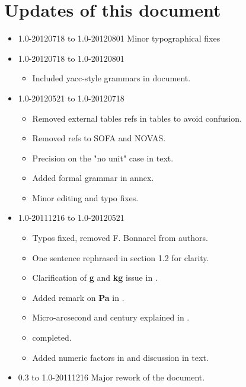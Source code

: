 \documentclass[12pt,notitlepage,onecolumn]{ivoa}
\newcommand{\unit}[1]{\textbf{\textsf{\color{orange}#1}}}
\begin{document}
\section{Updates of this document}
\begin{itemize}
\item 1.0-20120718 to 1.0-20120801
Minor typographical fixes
\item 1.0-20120718 to 1.0-20120801
  \begin{itemize}
    \item Included yacc-style grammars in document.
    \end{itemize}
\item 1.0-20120521 to 1.0-20120718
	\begin{itemize}
	\item Removed external tables refs in tables to avoid confusion.
	\item Removed refs to SOFA and NOVAS.
	\item Precision on the "no unit" case in text.
	\item Added formal grammar in annex.
	\item Minor editing and typo fixes.
	\end{itemize}
\item 1.0-20111216 to 1.0-20120521 
	\begin{itemize}
	\item Typos fixed, removed F. Bonnarel from authors. 
	\item One sentence rephrased in section 1.2 for clarity.
	\item Clarification of \unit{g} and \unit{kg} issue in .
	\item Added remark on \unit{Pa} in .
	\item Micro-arcsecond and century explained in .
	\item {} completed.
	\item Added numeric factors in  and discussion in text.
	\end{itemize}
\item 0.3 to 1.0-20111216 Major rework of the document.

\end{itemize}
\end{document}
